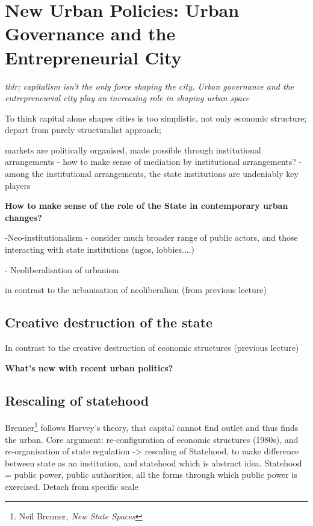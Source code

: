 \documentclass{article}
\begin{document}

\section{New Urban Policies: Urban Governance and the Entrepreneurial City}

\textit{tldr; capitalism isn't the only force shaping the city. Urban governance and the entrepreneurial city play an increasing role in shaping urban space}

To think capital  alone shapes cities is too simplistic, not only economic structure; depart from purely structuralist approach;

markets are politically organised, made possible through institutional arrangements 
	- how to make sense of mediation by institutional arrangements?
	- among the institutional arrangements, the state institutions are undeniably key players 

\textbf{How to make sense of the role of the State in contemporary urban changes?}

-Neo-institutionalism
	- consider much broader range of public actors, and those interacting with state institutions (ngos, lobbies....) 

- Neoliberalisation of urbanism

in contrast to the urbanisation of neoliberalism (from previous lecture)

\subsection{Creative destruction of the state}

In contrast to the creative destruction of economic structures (previous lecture)

\textbf{What's new with recent urban politics?}

\subsection{Rescaling of statehood}

Brenner\footnote{Neil Brenner, \textit{New State Spaces}} follows Harvey's theory, that capital cannot find outlet and thus finds the urban. 
Core argument: re-configuration of economic structures (1980s), and re-organisation of state regulation -> rescaling of Statehood, to make difference between state as an institution, and statehood which is abstract idea. Statehood = public power, public authorities, all the forms through which public power is exercised. Detach from specific scale
\end{document}
